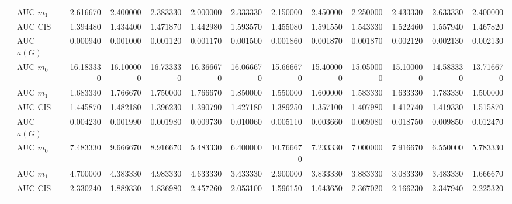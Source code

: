\begin{table}[htbp]
\begin{tabular}{llrrrrrrrrrrr}
    & AUC $m_1$ & 2.616670 & 2.400000 & 2.383330 & 2.000000 & 2.333330 & 2.150000 & 2.450000 & 2.250000 & 2.433330 & 2.633330 & 2.400000 \\
    & AUC CIS & 1.394480 & 1.434400 & 1.471870 & 1.442980 & 1.593570 & 1.455080 & 1.591550 & 1.543330 & 1.522460 & 1.557940 & 1.467820 \\
    \addlinespace
    \multirow{4}{*}{degree} & AUC $a(G)$ & 0.000940 & 0.001000 & 0.001120 & 0.001170 & 0.001500 & 0.001860 & 0.001870 & 0.001870 & 0.002120 & 0.002130 & 0.002130 \\
    & AUC $m_0$ & 16.183330 & 16.100000 & 16.733330 & 16.366670 & 16.066670 & 15.666670 & 15.400000 & 15.050000 & 15.100000 & 14.583330 & 13.716670 \\
    & AUC $m_1$ & 1.683330 & 1.766670 & 1.750000 & 1.766670 & 1.850000 & 1.550000 & 1.600000 & 1.583330 & 1.633330 & 1.783330 & 1.500000 \\
    & AUC CIS & 1.445870 & 1.482180 & 1.396230 & 1.390790 & 1.427180 & 1.389250 & 1.357100 & 1.407980 & 1.412740 & 1.419330 & 1.515870 \\
    \addlinespace
    \multirow{4}{*}{random} & AUC $a(G)$ & 0.004230 & 0.001990 & 0.001980 & 0.009730 & 0.010060 & 0.005110 & 0.003660 & 0.069080 & 0.018750 & 0.009850 & 0.012470 \\
    & AUC $m_0$ & 7.483330 & 9.666670 & 8.916670 & 5.483330 & 6.400000 & 10.766670 & 7.233330 & 7.000000 & 7.916670 & 6.550000 & 5.783330 \\
    & AUC $m_1$ & 4.700000 & 4.383330 & 4.983330 & 4.633330 & 3.433330 & 2.900000 & 3.833330 & 3.883330 & 3.083330 & 3.483330 & 1.666670 \\
    & AUC CIS & 2.330240 & 1.889330 & 1.836980 & 2.457260 & 2.053100 & 1.596150 & 1.643650 & 2.367020 & 2.166230 & 2.347940 & 2.225320 \\
    \addlinespace
    \bottomrule
  \end{tabular}
\end{table}

